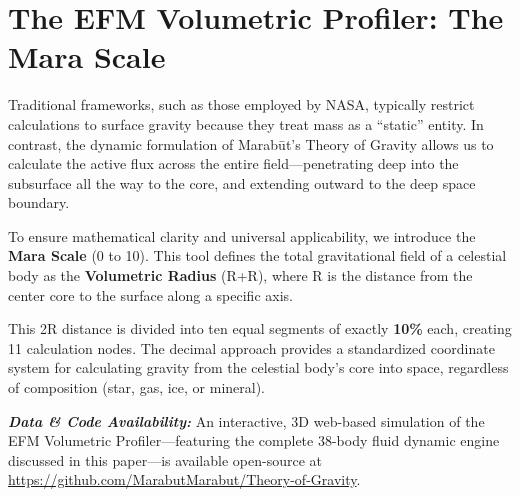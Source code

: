 \documentclass[11pt, a4paper]{article}
\begin{document}
\clearpage
\section{The EFM Volumetric Profiler: The Mara Scale}

Traditional frameworks, such as those employed by NASA, typically restrict calculations to surface gravity because they treat mass as a ``static'' entity. In contrast, the dynamic formulation of Marab\={u}t's Theory of Gravity allows us to calculate the active flux across the entire field---penetrating deep into the subsurface all the way to the core, and extending outward to the deep space boundary. 

To ensure mathematical clarity and universal applicability, we introduce the \textbf{Mara Scale} (0 to 10). This tool defines the total gravitational field of a celestial body as the \textbf{Volumetric Radius} (R+R), where R is the distance from the center core to the surface along a specific axis. 

This 2R distance is divided into ten equal segments of exactly \textbf{10\%} each, creating 11 calculation nodes. The decimal approach provides a standardized coordinate system for calculating gravity from the celestial body's core into space, regardless of composition (star, gas, ice, or mineral).

\vspace{1em}
\noindent \textit{\textbf{Data \& Code Availability:}} An interactive, 3D web-based simulation of the EFM Volumetric Profiler---featuring the complete 38-body fluid dynamic engine discussed in this paper---is available open-source at \url{https://github.com/MarabutMarabut/Theory-of-Gravity}.
\end{document}
